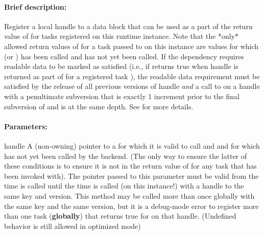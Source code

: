 \paragraph{Brief description:} Register a local handle to a data block
       that can be used as a part of the return value of  for tasks
       registered on this runtime instance.  Note that the *only* allowed return values of 
       for a task passed to  on this instance are values for which  (or
       ) has been called and  has not yet been called.  If the
       dependency requires readable data to be marked as satisfied (i.e., if 
       returns true when handle is returned as part of  for a registered task ),
       the readable data requirement must be satisfied by the release of all previous versions of handle
       \emph{and} a call to  on a handle with a penultimate subversion that is
       exactly 1 increment prior to the final subversion of  and is at the same depth.  See
        for more details.
     
     
     
\paragraph{Parameters:} 
\begin{compactdesc}
\item[handle] A (non-owning) pointer to a  for which it is
       valid to call  and  and for
       which  has not yet been called by the backend.  (The only
       way to ensure the latter of these conditions is to ensure it is not in the return value of
        for any task that  has been invoked with). The pointer
       passed to this parameter must be valid from the time  is called until the time
        is called (on this instance!) with a handle to the same key and version.  This method
       may be called more than once globally with the same key and the same version, but it is a debug-mode
       error to register more than one task ({\bf globally}) that returns true for  on
       that handle.  (Undefined behavior is still allowed in optimized mode)
\end{compactdesc}
    

